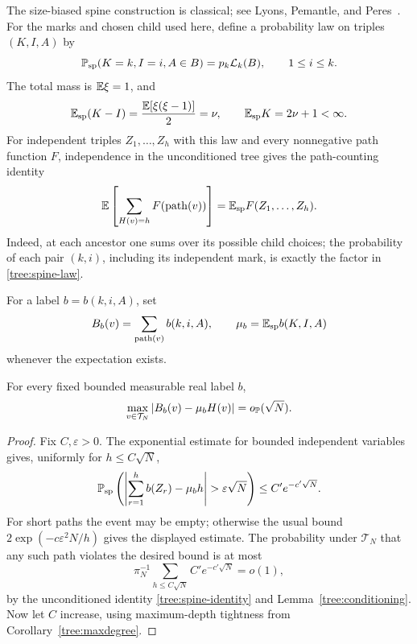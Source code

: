 The size-biased spine construction is classical; see
Lyons, Pemantle, and Peres~\cite[Section~2]{LyonsPemantlePeres1995}.
For the marks and chosen child used here, define a probability law on
triples $(K,I,A)$ by
\begin{equation}
 \P_{\mathrm{sp}}(K=k,I=i,A\in B)=p_k\mathcal L_k(B),
 \qquad 1\leq i\leq k.
 \label{tree:spine-law}
\end{equation}
The total mass is $\E\xi=1$, and
\begin{equation}
 \E_{\mathrm{sp}}(K-I)=\frac{\E[\xi(\xi-1)]}{2}=\nu,
 \qquad \E_{\mathrm{sp}}K=2\nu+1<\infty.
 \label{tree:spine-means}
\end{equation}
For independent triples $Z_1,\ldots,Z_h$ with this law and every
nonnegative path function $F$, independence in the unconditioned tree
gives the path-counting identity
\begin{equation}
 \E\left[\sum_{H(v)=h}F(\operatorname{path}(v))\right]
 =\E_{\mathrm{sp}}F(Z_1,\ldots,Z_h).
 \label{tree:spine-identity}
\end{equation}
Indeed, at each ancestor one sums over its possible child choices; the
probability of each pair $(k,i)$, including its independent mark, is
exactly the factor in \eqref{tree:spine-law}.

For a label $b=b(k,i,A)$, set
\[
 B_b(v)=\sum_{\operatorname{path}(v)}b(k,i,A),\qquad
 \mu_b=\E_{\mathrm{sp}}b(K,I,A)
\]
whenever the expectation exists.

\begin{lemma}
\label{tree:bounded-paths}
For every fixed bounded measurable real label $b$,
\begin{equation}
 \max_{v\in\mathcal T_N}|B_b(v)-\mu_bH(v)|
 =o_{\P}(\sqrt N).
 \label{tree:bounded-sums}
\end{equation}
\end{lemma}
\begin{proof}
Fix $C,\varepsilon>0$.  The exponential estimate for bounded independent
variables gives, uniformly for $h\leq C\sqrt N$,
\[
 \P_{\mathrm{sp}}\left(
 \left|\sum_{r=1}^h b(Z_r)-\mu_bh\right|>\varepsilon\sqrt N
 \right)\leq C' e^{-c'\sqrt N}.
\]
For short paths the event may be empty; otherwise the usual bound
$2\exp(-c\varepsilon^2N/h)$ gives the displayed estimate.  The
probability under $\mathcal T_N$ that any such path violates the desired
bound is at most
\[
 \pi_N^{-1}\sum_{h\leq C\sqrt N}C'e^{-c'\sqrt N}=o(1),
\]
by the unconditioned identity \eqref{tree:spine-identity} and
Lemma~\ref{tree:conditioning}.  Now let $C$ increase, using maximum-depth
tightness from Corollary~\ref{tree:maxdegree}.
\end{proof}

